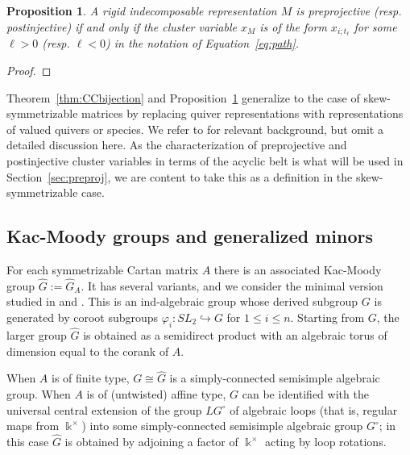 \documentclass[12pt]{amsart}
\newcommand{\kk}{\Bbbk}
\newcommand\into{\hookrightarrow}
\newcommand{\Qrep}{M}
\newcommand{\Zidx}{\ell}
\newtheorem{proposition}[theorem]{Proposition}
\theoremstyle{remark}
\numberwithin{equation}{section}
\numberwithin{figure}{section}
\begin{document}
\begin{proposition}\label{prop:ccvsacyclicbelt}
A rigid indecomposable representation $\Qrep$ is preprojective (resp. postinjective) if and only if the cluster variable $x_M$ is of the form $x_{i;t_\Zidx}$ for some $\Zidx > 0$ (resp. $\Zidx < 0$) in the notation of Equation~\ref{eq:path}.
\end{proposition}
\begin{proof}
\end{proof}

Theorem~\ref{thm:CCbijection} and Proposition~\ref{prop:ccvsacyclicbelt} generalize to the case of skew-symmetrizable matrices by replacing quiver representations with representations of valued quivers or species.
We refer to \cite{Ru15} for relevant background, but omit a detailed discussion here. 
As the characterization of preprojective and postinjective cluster variables in terms of the acyclic belt is what will be used in Section~\ref{sec:preproj}, we are content to take this as a definition in the skew-symmetrizable case. 

\subsection{Kac-Moody groups and generalized minors}\label{sec:group background}

For each symmetrizable Cartan matrix $A$ there is an associated Kac-Moody group $\widehat{G}:=\widehat{G}_A$.
It has several variants, and we consider the minimal version studied in \cite{KP83} and \cite[Section 7.4]{Kum02}.
This is an ind-algebraic group whose derived subgroup $G$ is generated by coroot subgroups $\varphi_i: SL_2 \into G$ for $1 \leq i \leq n$.
Starting from $G$, the larger group $\widehat{G}$ is obtained as a semidirect product with an algebraic torus of dimension equal to the corank of $A$.

When $A$ is of finite type, $G \cong \widehat{G}$ is a simply-connected semisimple algebraic group.
When $A$ is of (untwisted) affine type, $G$ can be identified with the universal central extension of the group $LG^\circ$ of algebraic loops (that is, regular maps from $\kk^\times$) into some simply-connected semisimple algebraic group $G^\circ$; in this case $\widehat{G}$ is obtained by adjoining a factor of $\kk^\times$ acting by loop rotations.
\end{document}
